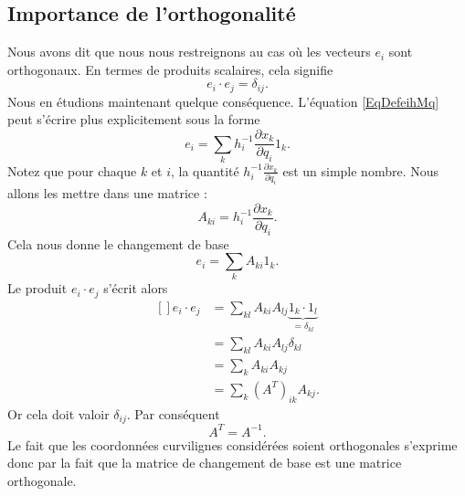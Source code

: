 \subsection{Importance de l'orthogonalité}

Nous avons dit que nous nous restreignons au cas où les vecteurs $e_i$ sont orthogonaux. En termes de produits scalaires, cela signifie
\begin{equation}
    e_i\cdot e_j=\delta_{ij}.
\end{equation}
Nous en étudions maintenant quelque conséquence. L'équation \eqref{EqDefeihMq} peut s'écrire plus explicitement sous la forme
\begin{equation}
    e_i=\sum_k h_i^{-1}\frac{ \partial x_k }{ \partial q_i }1_k.
\end{equation}
Notez que pour chaque $k$ et $i$, la quantité $h_i^{-1}\frac{ \partial x_k }{ \partial q_i }$ est un simple nombre. Nous allons les mettre dans une matrice :
\begin{equation}
    A_{ki}=h_i^{-1}\frac{ \partial x_k }{ \partial q_i }.
\end{equation}
Cela nous donne le changement de base
\begin{equation}        \label{EqChmBaseeisAkiAk}
    e_i=\sum_kA_{ki}1_k.
\end{equation}
Le produit $e_i\cdot e_j$ s'écrit alors
\begin{equation}
    \begin{aligned}[]
        e_i\cdot e_j&=\sum_{kl}A_{ki}A_{lj}\underbrace{1_k\cdot 1_l}_{=\delta_{kl}}\\
        &=\sum_{kl}A_{ki}A_{lj}\delta_{kl}\\
        &=\sum_kA_{ki}A_{kj}\\
        &=\sum_k(A^T)_{ik}A_{kj}.
    \end{aligned}
\end{equation}
Or cela doit valoir $\delta_{ij}$. Par conséquent 
\begin{equation}
    A^T=A^{-1}.
\end{equation}
Le fait que les coordonnées curvilignes considérées soient orthogonales s'exprime donc par la fait que la matrice de changement de base est une matrice orthogonale.

